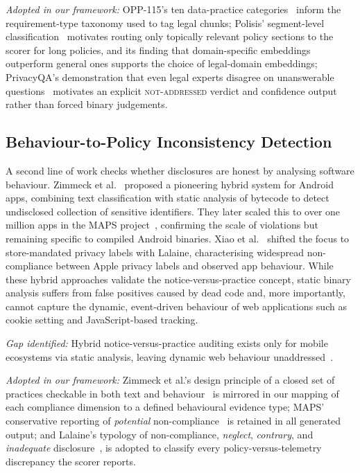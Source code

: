 \documentclass[conference]{IEEEtran}
\begin{document}
\noindent\textit{Adopted in our framework:} OPP-115's ten data-practice categories~\cite{wilson-2016-opp115} inform the requirement-type taxonomy used to tag legal chunks; Polisis' segment-level classification~\cite{harkous-2018-polisis} motivates routing only topically relevant policy sections to the scorer for long policies, and its finding that domain-specific embeddings outperform general ones supports the choice of legal-domain embeddings; PrivacyQA's demonstration that even legal experts disagree on unanswerable questions~\cite{ravichander-2019-privacyqa} motivates an explicit \textsc{not-addressed} verdict and confidence output rather than forced binary judgements.

\subsection{Behaviour-to-Policy Inconsistency Detection}
A second line of work checks whether disclosures are honest by analysing software behaviour. Zimmeck et al.~\cite{zimmeck-2017-mobileapps} proposed a pioneering hybrid system for Android apps, combining text classification with static analysis of bytecode to detect undisclosed collection of sensitive identifiers. They later scaled this to over one million apps in the MAPS project~\cite{zimmeck-2019-maps}, confirming the scale of violations but remaining specific to compiled Android binaries. Xiao et al.~\cite{xiao-2023-lalaine} shifted the focus to store-mandated privacy labels with Lalaine, characterising widespread non-compliance between Apple privacy labels and observed app behaviour. While these hybrid approaches validate the notice-versus-practice concept, static binary analysis suffers from false positives caused by dead code and, more importantly, cannot capture the dynamic, event-driven behaviour of web applications such as cookie setting and JavaScript-based tracking.

\noindent\textit{Gap identified:} Hybrid notice-versus-practice auditing exists only for mobile ecosystems via static analysis, leaving dynamic web behaviour unaddressed~\cite{zimmeck-2017-mobileapps,zimmeck-2019-maps,xiao-2023-lalaine}.

\noindent\textit{Adopted in our framework:} Zimmeck et al.'s design principle of a closed set of practices checkable in both text and behaviour~\cite{zimmeck-2017-mobileapps} is mirrored in our mapping of each compliance dimension to a defined behavioural evidence type; MAPS' conservative reporting of \emph{potential} non-compliance~\cite{zimmeck-2019-maps} is retained in all generated output; and Lalaine's typology of non-compliance, \emph{neglect}, \emph{contrary}, and \emph{inadequate} disclosure~\cite{xiao-2023-lalaine}, is adopted to classify every policy-versus-telemetry discrepancy the scorer reports.
\end{document}
